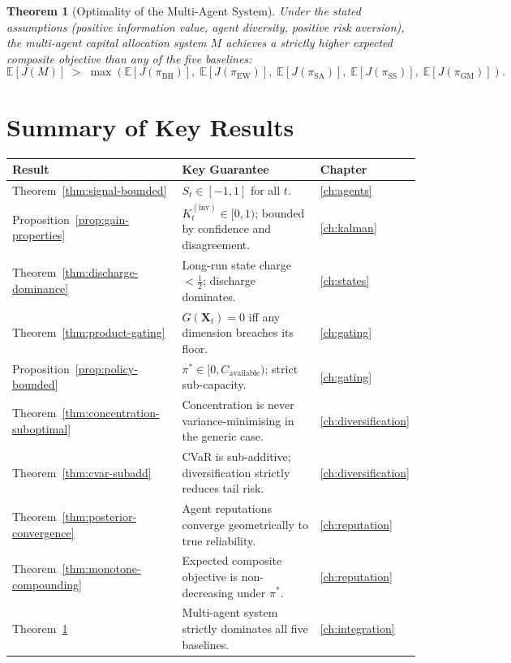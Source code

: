 \documentclass[12pt,openany]{book}
\newcommand{\E}{\mathbb{E}}
\numberwithin{equation}{chapter}
\theoremstyle{plain}
\newtheorem{theorem}{Theorem}[chapter]
\theoremstyle{definition}
\theoremstyle{remark}
\renewcommand{\arraystretch}{1.2}
\def\mathcal#1{#1}%
\begin{document}
\begin{theorem}[Optimality of the Multi-Agent System]
\label{thm:main-optimality}
Under the stated assumptions (positive information value, agent
diversity, positive risk aversion), the multi-agent capital
allocation system $\mathcal{M}$ achieves a strictly higher
expected composite objective than any of the five baselines:
\begin{equation}
  \E[J(\mathcal{M})]
  \;>\;
  \max\!\left(
    \E[J(\pi_{\mathrm{BH}})],\;
    \E[J(\pi_{\mathrm{EW}})],\;
    \E[J(\pi_{\mathrm{SA}})],\;
    \E[J(\pi_{\mathrm{SS}})],\;
    \E[J(\pi_{\mathrm{GM}})]
  \right).
\end{equation}
\end{theorem}

\chapter*{Summary of Key Results}

\begin{center}
\renewcommand{\arraystretch}{1.35}
\begin{tabularx}{\textwidth}{@{} l X X @{}}
\toprule
\textbf{Result} & \textbf{Key Guarantee} & \textbf{Chapter} \\
\midrule
Theorem~\ref{thm:signal-bounded}
  & $S_t \in [-1,1]$ for all $t$.
  & \ref{ch:agents} \\
Proposition~\ref{prop:gain-properties}
  & $K_t^{(\mathrm{inv})} \in [0,1)$; bounded by confidence and disagreement.
  & \ref{ch:kalman} \\
Theorem~\ref{thm:discharge-dominance}
  & Long-run state charge $< \tfrac{1}{2}$; discharge dominates.
  & \ref{ch:states} \\
Theorem~\ref{thm:product-gating}
  & $G(\mathbf{X}_t) = 0$ iff any dimension breaches its floor.
  & \ref{ch:gating} \\
Proposition~\ref{prop:policy-bounded}
  & $\pi^* \in [0, C_{\mathrm{available}})$; strict sub-capacity.
  & \ref{ch:gating} \\
Theorem~\ref{thm:concentration-suboptimal}
  & Concentration is never variance-minimising in the generic case.
  & \ref{ch:diversification} \\
Theorem~\ref{thm:cvar-subadd}
  & CVaR is sub-additive; diversification strictly reduces tail risk.
  & \ref{ch:diversification} \\
Theorem~\ref{thm:posterior-convergence}
  & Agent reputations converge geometrically to true reliability.
  & \ref{ch:reputation} \\
Theorem~\ref{thm:monotone-compounding}
  & Expected composite objective is non-decreasing under $\pi^*$.
  & \ref{ch:reputation} \\
Theorem~\ref{thm:main-optimality}
  & Multi-agent system strictly dominates all five baselines.
  & \ref{ch:integration} \\
\bottomrule
\end{tabularx}
\end{center}
\end{document}
